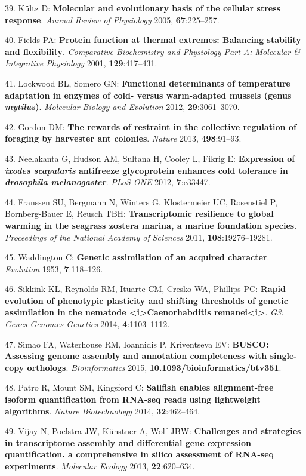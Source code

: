 \documentclass[]{article}
\begin{document}
39. K{ü}ltz D: \textbf{Molecular and evolutionary basis of the cellular
stress response}. \emph{Annual Review of Physiology} 2005,
\textbf{67}:225--257.

40. Fields PA: \textbf{Protein function at thermal extremes: Balancing
stability and flexibility}. \emph{Comparative Biochemistry and
Physiology Part A: Molecular \& Integrative Physiology} 2001,
\textbf{129}:417--431.

41. Lockwood BL, Somero GN: \textbf{Functional determinants of
temperature adaptation in enzymes of cold- versus warm-adapted mussels
(genus \emph{mytilus})}. \emph{Molecular Biology and Evolution} 2012,
\textbf{29}:3061--3070.

42. Gordon DM: \textbf{The rewards of restraint in the collective
regulation of foraging by harvester ant colonies}. \emph{Nature} 2013,
\textbf{498}:91--93.

43. Neelakanta G, Hudson AM, Sultana H, Cooley L, Fikrig E:
\textbf{Expression of \emph{ixodes scapularis} antifreeze glycoprotein
enhances cold tolerance in \emph{drosophila melanogaster}}. \emph{PLoS
ONE} 2012, \textbf{7}:e33447.

44. Franssen SU, Bergmann N, Winters G, Klostermeier UC, Rosenstiel P,
Bornberg-Bauer E, Reusch TBH: \textbf{Transcriptomic resilience to
global warming in the seagrass zostera marina, a marine foundation
species}. \emph{Proceedings of the National Academy of Sciences} 2011,
\textbf{108}:19276--19281.

45. Waddington C: \textbf{Genetic assimilation of an acquired
character}. \emph{Evolution} 1953, \textbf{7}:118--126.

46. Sikkink KL, Reynolds RM, Ituarte CM, Cresko WA, Phillips PC:
\textbf{Rapid evolution of phenotypic plasticity and shifting thresholds
of genetic assimilation in the nematode
\textless{}i\textgreater{}Caenorhabditis
remanei\textless{}i\textgreater{}}. \emph{G3: Genes Genomes Genetics}
2014, \textbf{4}:1103--1112.

47. Simao FA, Waterhouse RM, Ioannidis P, Kriventseva EV: \textbf{BUSCO:
Assessing genome assembly and annotation completeness with single-copy
orthologs}. \emph{Bioinformatics} 2015,
\textbf{10.1093/bioinformatics/btv351}.

48. Patro R, Mount SM, Kingsford C: \textbf{Sailfish enables
alignment-free isoform quantification from RNA-seq reads using
lightweight algorithms}. \emph{Nature Biotechnology} 2014,
\textbf{32}:462--464.

49. Vijay N, Poelstra JW, K{ü}nstner A, Wolf JBW: \textbf{Challenges and
strategies in transcriptome assembly and differential gene expression
quantification. a comprehensive in silico assessment of RNA-seq
experiments}. \emph{Molecular Ecology} 2013, \textbf{22}:620--634.
\end{document}
